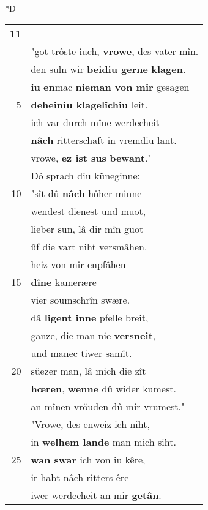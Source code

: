 \documentclass[8pt,a4paper,notitlepage]{article}
\begin{document}
\begin{table}[ht]
\begin{minipage}[t]{0.5\linewidth}
\small
\begin{center}*D
\end{center}
\begin{tabular}{rl}
\textbf{11} & \textit{\begin{large}D\end{large}}ô sprach der junge Anschevin:\\ 
 & "got trôste iuch, \textbf{vrowe}, des vater mîn.\\ 
 & den suln wir \textbf{beidiu gerne} \textbf{klagen}.\\ 
 & \textbf{iu} \textbf{en}mac \textbf{nieman von mir} gesagen\\ 
5 & \textbf{deheiniu klagelîchiu} leit.\\ 
 & ich var durch mîne werdecheit\\ 
 & \textbf{nâch} ritterschaft in vremdiu lant.\\ 
 & vrowe, \textbf{ez ist sus} \textbf{bewant}."\\ 
 & Dô sprach diu küneginne:\\ 
10 & "sît dû \textbf{nâch} hôher minne\\ 
 & wendest dienest und muot,\\ 
 & lieber sun, lâ dir mîn guot\\ 
 & ûf die vart niht versmâhen.\\ 
 & heiz von mir enpfâhen\\ 
15 & \textbf{dîne} kamerære\\ 
 & vier soumschrîn swære.\\ 
 & dâ \textbf{ligent inne} pfelle breit,\\ 
 & ganze, die man nie \textbf{versneit},\\ 
 & und manec tiwer samît.\\ 
20 & süezer man, lâ mich die zît\\ 
 & \textbf{hœren}, \textbf{wenne} dû wider kumest.\\ 
 & an mînen vröuden dû mir vrumest."\\ 
 & "Vrowe, des enweiz ich niht,\\ 
 & in \textbf{welhem lande} man mich siht.\\ 
25 & \textbf{wan swar} ich von iu kêre,\\ 
 & ir habt nâch ritters êre\\ 
 & iwer werdecheit an mir \textbf{getân}.\\ 

\end{tabular}
\end{minipage}
\end{table}
\end{document}
